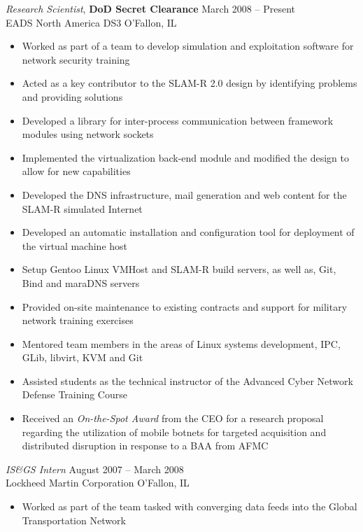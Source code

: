 \documentclass[margin,line]{resume}
\begin{document}
\begin{resume}
{\sl Research Scientist}, \textbf{\small DoD Secret Clearance}   \hfill  March 2008 -- Present\\
EADS North America DS3                                          \hfill  O'Fallon, IL
\begin{itemize} \itemsep -2pt %
\small\item Worked as part of a team to develop simulation and exploitation software for network security training
\small\item Acted as a key contributor to the SLAM-R 2.0 design by identifying problems and providing solutions
\small\item Developed a library for inter-process communication between framework modules using network sockets
\small\item Implemented the virtualization back-end module and modified the design to allow for new capabilities
\small\item Developed the DNS infrastructure, mail generation and web content for the SLAM-R simulated Internet
\small\item Developed an automatic installation and configuration tool for deployment of the virtual machine host 
\small\item Setup Gentoo Linux VMHost and SLAM-R build servers, as well as, Git, Bind and maraDNS servers
\small\item Provided on-site maintenance to existing contracts and support for military network training exercises
\small\item Mentored team members in the areas of Linux systems development, IPC, GLib, libvirt, KVM and Git
\small\item Assisted students as the technical instructor of the Advanced Cyber Network Defense Training Course
\small\item Received an {\sl On-the-Spot Award} from the CEO for a research proposal regarding the utilization of
            mobile botnets for targeted acquisition and distributed disruption in response to a BAA from AFMC

\end{itemize}

{\sl IS\&GS Intern}                 \hfill  August 2007 -- March 2008\\
Lockheed Martin Corporation         \hfill  O'Fallon, IL
\begin{itemize} \itemsep -2pt %
\small\item Worked as part of the team tasked with converging data feeds into the Global Transportation Network
\end{itemize}


\end{resume}
\end{document}
